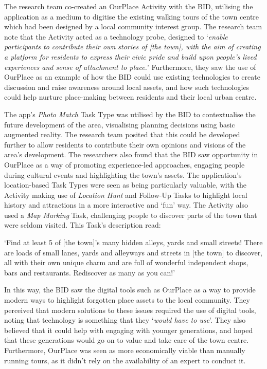 The research team co-created an OurPlace Activity with the BID, utilising the application as a medium to digitise the existing walking tours of the town centre which had been designed by a local community interest group. The research team note that the Activity acted as a technology probe, designed to `\textit{enable participants to contribute their own stories of [the town], with the aim of creating a platform for residents to express their civic pride and build upon people’s lived experiences and sense of attachment to place.}' Furthermore, they saw the use of OurPlace as an example of how the BID could use existing technologies to create discussion and raise awareness around local assets, and how such technologies could help nurture place-making between residents and their local urban centre.

The app's \textit{Photo Match} Task Type was utilised by the BID to contextualise the future development of the area, visualising planning decisions using basic augmented reality. The research team posited that this could be developed further to allow residents to contribute their own opinions and visions of the area's development. The researchers also found that the BID saw opportunity in OurPlace as a way of promoting experience-led approaches, engaging people during cultural events and highlighting the town's assets. The application's location-based Task Types were seen as being particularly valuable, with the Activity making use of \textit{Location Hunt} and Follow-Up Tasks to highlight local history and attractions in a more interactive and `fun' way. The Activity also used a \textit{Map Marking} Task, challenging people to discover parts of the town that were seldom visited. This Task's description read:

\begin{displayquote}
`Find at least 5 of [the town]'s many hidden alleys, yards and small streets! There are loads of small lanes, yards and alleyways and streets in [the town] to discover, all with their own unique charm and are full of wonderful independent shops, bars and restaurants. Rediscover as many as you can!'
\end{displayquote}

In this way, the BID saw the digital tools such as OurPlace as a way to provide modern ways to highlight forgotten place assets to the local community. They perceived that modern solutions to these issues required the use of digital tools, noting that technology is something that they `\textit{would have to use}'. They also believed that it could help with engaging with younger generations, and hoped that these generations would go on to value and take care of the town centre. Furthermore, OurPlace was seen as more economically viable than manually running tours, as it didn't rely on the availability of an expert to conduct it.

